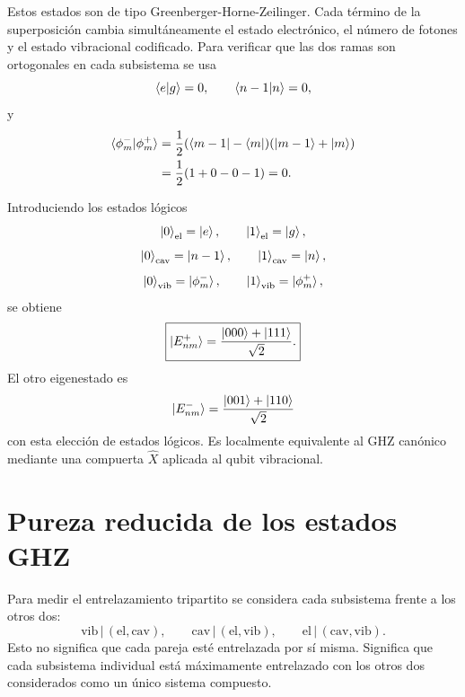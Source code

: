 \documentclass[11pt]{article}
\begin{document}
Estos estados son de tipo Greenberger-Horne-Zeilinger. Cada t\'ermino de la
superposici\'on cambia simult\'aneamente el estado electr\'onico, el n\'umero de
fotones y el estado vibracional codificado. Para verificar que las dos ramas
son ortogonales en cada subsistema se usa
\begin{equation}
  \braket{e|g}=0,
  \qquad
  \braket{n-1|n}=0,
\end{equation}
y
\begin{equation}
\begin{aligned}
  \braket{\phi_m^{-}|\phi_m^{+}}
  &=
  \frac12
  (\bra{m-1}-\bra m)
  (\ket{m-1}+\ket m)
  \\
  &=
  \frac12(1+0-0-1)
  =0.
\end{aligned}
\end{equation}

Introduciendo los estados l\'ogicos
\begin{equation}
  \ket0_{\mathrm{el}}=\ket e,
  \qquad
  \ket1_{\mathrm{el}}=\ket g,
\end{equation}
\begin{equation}
  \ket0_{\mathrm{cav}}=\ket{n-1},
  \qquad
  \ket1_{\mathrm{cav}}=\ket n,
\end{equation}
\begin{equation}
  \ket0_{\mathrm{vib}}=\ket{\phi_m^{-}},
  \qquad
  \ket1_{\mathrm{vib}}=\ket{\phi_m^{+}},
\end{equation}
se obtiene
\begin{equation}
  \boxed{
  \ket{E_{nm}^{+}}
  =
  \frac{\ket{000}+\ket{111}}{\sqrt2}.
  }
\end{equation}
El otro eigenestado es
\begin{equation}
  \ket{E_{nm}^{-}}
  =
  \frac{\ket{001}+\ket{110}}{\sqrt2}
\end{equation}
con esta elecci\'on de estados l\'ogicos. Es localmente equivalente al GHZ
can\'onico mediante una compuerta $\hat X$ aplicada al qubit vibracional.

\section{Pureza reducida de los estados GHZ}

Para medir el entrelazamiento tripartito se considera cada subsistema frente a
los otros dos:
\begin{equation}
  \mathrm{vib}\,|\,(\mathrm{el,cav}),
  \qquad
  \mathrm{cav}\,|\,(\mathrm{el,vib}),
  \qquad
  \mathrm{el}\,|\,(\mathrm{cav,vib}).
\end{equation}
Esto no significa que cada pareja est\'e entrelazada por s\'i misma. Significa
que cada subsistema individual est\'a m\'aximamente entrelazado con los otros
dos considerados como un \'unico sistema compuesto.
\end{document}
